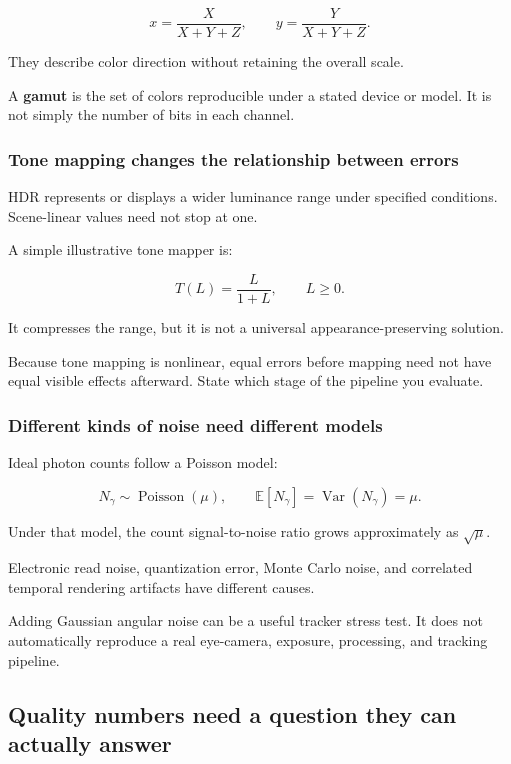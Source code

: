 \[
x=\frac{X}{X+Y+Z},
\qquad y=\frac{Y}{X+Y+Z}.
\]

They describe color direction without retaining the overall scale.

A \textbf{gamut} is the set of colors reproducible under a stated device or model. It is not simply the number of bits in each channel.

\subsubsection{Tone mapping changes the relationship between errors}\label{04-visual-computing-ii-ch043-tone-mapping-changes-the-relationship-between-errors}

HDR represents or displays a wider luminance range under specified conditions. Scene-linear values need not stop at one.

A simple illustrative tone mapper is:

\[
T(L)=\frac{L}{1+L},
\qquad L\geq0.
\]

It compresses the range, but it is not a universal appearance-preserving solution.

Because tone mapping is nonlinear, equal errors before mapping need not have equal visible effects afterward. State which stage of the pipeline you evaluate.

\subsubsection{Different kinds of noise need different models}\label{04-visual-computing-ii-ch043-different-kinds-of-noise-need-different-models}

Ideal photon counts follow a Poisson model:

\[
N_\gamma\sim\operatorname{Poisson}(\mu),
\qquad
\mathbb E[N_\gamma]=\operatorname{Var}(N_\gamma)=\mu.
\]

Under that model, the count signal-to-noise ratio grows approximately as \(\sqrt{\mu}\).

Electronic read noise, quantization error, Monte Carlo noise, and correlated temporal rendering artifacts have different causes.

Adding Gaussian angular noise can be a useful tracker stress test. It does not automatically reproduce a real eye-camera, exposure, processing, and tracking pipeline.

\subsection{Quality numbers need a question they can actually answer}\label{04-visual-computing-ii-ch043-quality-numbers-need-a-question-they-can-actually-answer}


